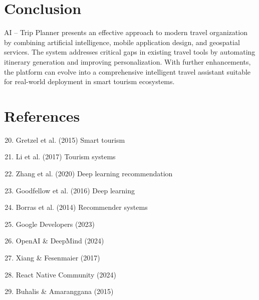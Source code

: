 \documentclass[12pt,a4paper]{article}
\begin{document}
\section{Conclusion}
AI -- Trip Planner presents an effective approach to modern travel organization by combining artificial intelligence, mobile application design, and geospatial services. The system addresses critical gaps in existing travel tools by automating itinerary generation and improving personalization. With further enhancements, the platform can evolve into a comprehensive intelligent travel assistant suitable for real-world deployment in smart tourism ecosystems.

\section{References}
\begin{enumerate}
    \setcounter{enumi}{19}
    \item Gretzel et al. (2015) Smart tourism
    \item Li et al. (2017) Tourism systems
    \item Zhang et al. (2020) Deep learning recommendation
    \item Goodfellow et al. (2016) Deep learning
    \item Borras et al. (2014) Recommender systems
    \item Google Developers (2023)
    \item OpenAI \& DeepMind (2024)
    \item Xiang \& Fesenmaier (2017)
    \item React Native Community (2024)
    \item Buhalis \& Amaranggana (2015)
\end{enumerate}
\end{document}
